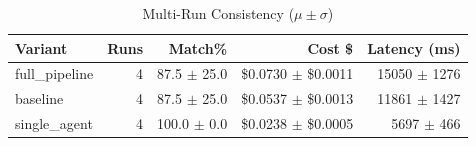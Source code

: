 \begin{table}[htbp]
\centering
\caption{Multi-Run Consistency ($\mu \pm \sigma$)}
\label{tab:consistency}
\begin{tabular}{l r rrr}
\toprule
Variant & Runs & Match\% & Cost \$ & Latency (ms) \\
\midrule
  full\_pipeline & 4 & 87.5 $\pm$ 25.0 & \$0.0730 $\pm$ \$0.0011 & 15050 $\pm$ 1276 \\
  baseline & 4 & 87.5 $\pm$ 25.0 & \$0.0537 $\pm$ \$0.0013 & 11861 $\pm$ 1427 \\
  single\_agent & 4 & 100.0 $\pm$ 0.0 & \$0.0238 $\pm$ \$0.0005 & 5697 $\pm$ 466 \\
\bottomrule
\end{tabular}
\end{table}
